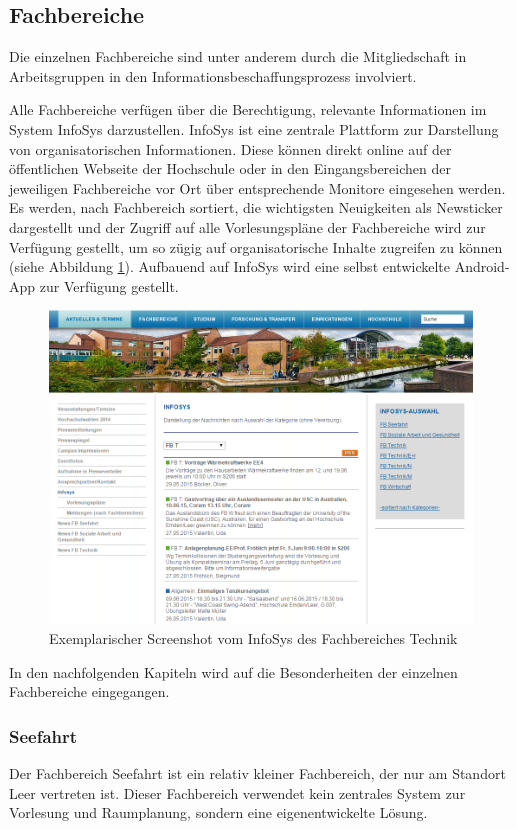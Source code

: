 \subsection{Fachbereiche}
Die einzelnen Fachbereiche sind unter anderem durch die Mitgliedschaft in Arbeitsgruppen in den Informationsbeschaffungsprozess involviert.

Alle Fachbereiche verfügen über die Berechtigung, relevante Informationen im System InfoSys darzustellen. InfoSys ist eine zentrale Plattform zur Darstellung von organisatorischen Informationen. Diese können direkt online auf der öffentlichen Webseite der Hochschule oder in den Eingangsbereichen der jeweiligen Fachbereiche vor Ort über entsprechende Monitore eingesehen werden. Es werden, nach Fachbereich sortiert, die wichtigsten Neuigkeiten als Newsticker dargestellt und der Zugriff auf alle Vorlesungspläne der Fachbereiche wird zur Verfügung gestellt, um so zügig auf organisatorische Inhalte zugreifen zu können (siehe Abbildung \ref{fig_InfoSys}). Aufbauend auf InfoSys wird eine selbst entwickelte Android-App zur Verfügung gestellt.

\begin{figure}[h!]
	\centering
	\includegraphics[width=14cm]{kapitel/gruppe2/bilder/InfoSys}
	\caption{Exemplarischer Screenshot vom InfoSys des Fachbereiches Technik}
	\label{fig_InfoSys}
\end{figure}

In den nachfolgenden Kapiteln wird auf die Besonderheiten der einzelnen Fachbereiche eingegangen.

\subsubsection{Seefahrt}
Der Fachbereich Seefahrt ist ein relativ kleiner Fachbereich, der nur am Standort Leer vertreten ist. Dieser Fachbereich verwendet kein zentrales System zur Vorlesung und Raumplanung, sondern eine eigenentwickelte Lösung. 

